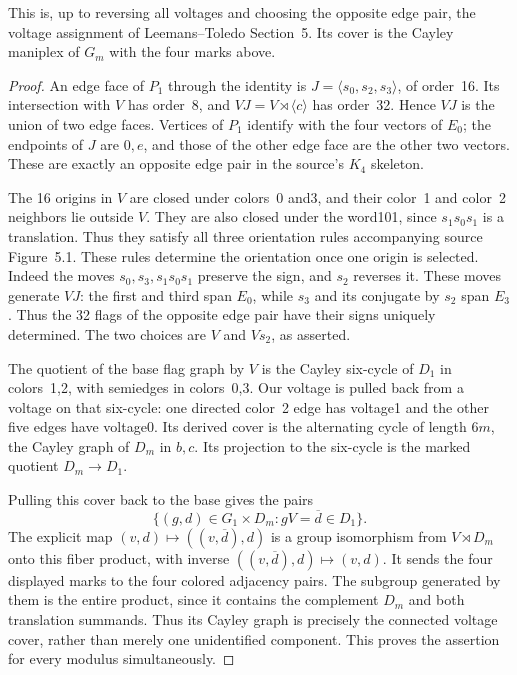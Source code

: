 \documentclass[a4paper,11pt]{article}
\newcommand{\gen}[1]{\langle#1\rangle}\newcommand{\Aut}{\operatorname{Aut}}
\begin{document}
\begin{proposition}\label{sourcevoltage}
This is, up to reversing all voltages and choosing the opposite edge
pair, the voltage assignment of Leemans--Toledo Section~5. Its cover is
the Cayley maniplex of $G_m$ with the four marks above.
\end{proposition}
\begin{proof}
An edge face of $P_1$ through the identity is
$J=\gen{s_0,s_2,s_3}$, of order~16. Its intersection with $V$ has order~8,
and $VJ=V\rtimes\gen{c}$ has order~32. Hence $VJ$ is the union of two
edge faces. Vertices of $P_1$ identify with the four vectors of $E_0$;
the endpoints of $J$ are $0,e$, and those of the other edge face are
the other two vectors. These are exactly an opposite edge pair in the
source's $K_4$ skeleton.

The 16 origins in $V$ are closed under colors~0 and3, and their color~1
and color~2 neighbors lie outside $V$. They are also closed under the
word101, since $s_1s_0s_1$ is a translation. Thus they satisfy all three
orientation rules accompanying source Figure~5.1. These rules determine
the orientation once one origin is selected. Indeed the moves
$s_0,s_3,s_1s_0s_1$ preserve the sign, and $s_2$ reverses it.
These moves generate $VJ$: the first and third span $E_0$, while
$s_3$ and its conjugate by $s_2$ span $E_3$. Thus the 32 flags of the
opposite edge pair have their signs uniquely determined. The two
choices are $V$ and $Vs_2$, as asserted.

The quotient of the base flag graph by $V$ is the Cayley six-cycle of
$D_1$ in colors~1,2, with semiedges in colors~0,3. Our voltage is pulled
back from a voltage on that six-cycle: one directed color~2 edge has
voltage1 and the other five edges have voltage0. Its derived cover is
the alternating cycle of length $6m$, the Cayley graph of $D_m$ in
$b,c$. Its projection to the six-cycle is the marked quotient
$D_m\to D_1$.

Pulling this cover back to the base gives the pairs
\[
\{(g,d)\in G_1\times D_m: gV=\overline d\in D_1\}.
\]
The explicit map $(v,d)\mapsto((v,\overline d),d)$ is a group
isomorphism from $V\rtimes D_m$ onto this fiber product, with inverse
$((v,\overline d),d)\mapsto(v,d)$. It sends the four displayed marks
to the four colored adjacency pairs. The subgroup generated by them
is the entire product, since it contains the complement $D_m$ and
both translation summands. Thus its Cayley graph is precisely the
connected voltage cover, rather than merely one unidentified component.
This proves the assertion for every modulus simultaneously.
\end{proof}
\end{document}
